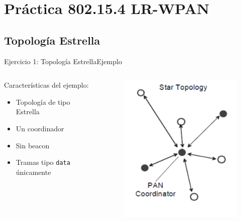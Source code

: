 \documentclass[aspectratio=169,handout]{beamer}
\begin{document}
%
\section{Práctica 802.15.4 LR-WPAN}

\subsection[Estrella]{Topología Estrella}

\begin{frame}[t]{Ejercicio 1: Topología Estrella}{Ejemplo}
\begin{columns}[t]
    \begin{column}{.5\textwidth}
        \begin{minipage}[t][0.7\textheight][s]{\columnwidth}
        Características del ejemplo:
        \vspace{30px}
            \begin{itemize}
	            \item Topología de tipo Estrella
	            \vspace{5px}
				\item Un coordinador
				\vspace{5px}            
	            \item Sin beacon
				\vspace{5px}
	            \item Tramas tipo \texttt{data} únicamente
	            \vspace{5px}
        		\end{itemize}
        \end{minipage}
    \end{column}
    \begin{column}{.5\textwidth}
        \begin{minipage}[t][0.7\textheight][s]{\columnwidth}
            \begin{figure}[H]
                \includegraphics[width=.6\textwidth]{./imagenes/Topology-Star}

\end{figure}
\end{minipage}
\end{column}
\end{columns}
\end{frame}
\end{document}

